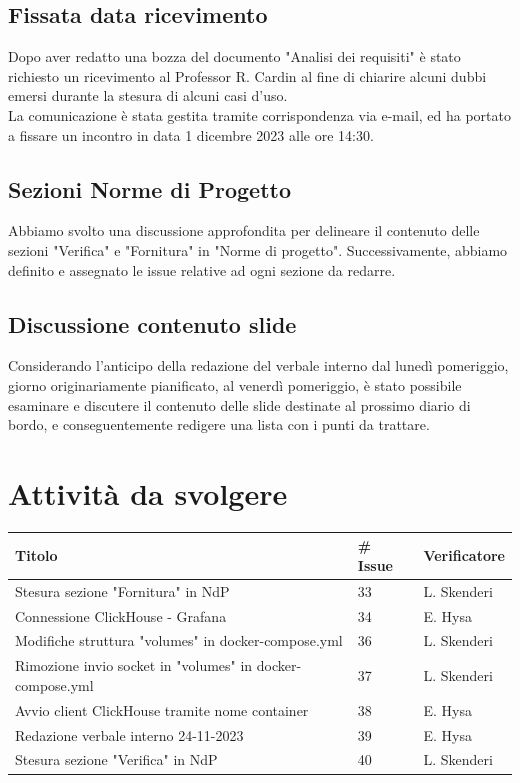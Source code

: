 \documentclass{article}
\begin{document}
    \subsection{Fissata data ricevimento}
        Dopo aver redatto una bozza del documento "Analisi dei requisiti" è stato richiesto un ricevimento al Professor R. Cardin al fine di chiarire alcuni dubbi emersi durante la stesura di alcuni casi d'uso.\\
        La comunicazione è stata gestita tramite corrispondenza via e-mail, ed ha portato a fissare un incontro in data 1 dicembre 2023 alle ore 14:30.

    \subsection{Sezioni Norme di Progetto}
        Abbiamo svolto una discussione approfondita per delineare il contenuto delle sezioni "Verifica" e "Fornitura" in "Norme di progetto". Successivamente, abbiamo definito e assegnato le issue relative ad ogni sezione da redarre. 
    
    \subsection{Discussione contenuto slide}
        Considerando l'anticipo della redazione del verbale interno dal lunedì pomeriggio, giorno originariamente pianificato, al venerdì pomeriggio, è stato possibile esaminare e discutere il contenuto delle slide destinate al prossimo diario di bordo, e conseguentemente redigere una lista con i punti da trattare.  
        
\section{Attività da svolgere}
    \begin{center}
        \begin{tabular}{|C{7cm}|C{1,5cm}|C{3cm}|}
            \hline
            \textbf{Titolo} & \textbf{\# Issue} & \textbf{Verificatore} \\
            \hline\hline
            Stesura sezione "Fornitura" in NdP & 33 & L. Skenderi\\
            \hline
            Connessione ClickHouse - Grafana & 34 & E. Hysa\\
            \hline
            Modifiche struttura "volumes" in docker-compose.yml & 36 & L. Skenderi\\
            \hline
            Rimozione invio socket in "volumes" in docker-compose.yml & 37 & L. Skenderi\\
            \hline
            Avvio client ClickHouse tramite nome container & 38 & E. Hysa\\
            \hline
            Redazione verbale interno 24-11-2023 & 39 & E. Hysa\\
            \hline
            Stesura sezione "Verifica" in NdP & 40 & L. Skenderi\\
            \hline
        \end{tabular}
    \end{center}
\end{document}
